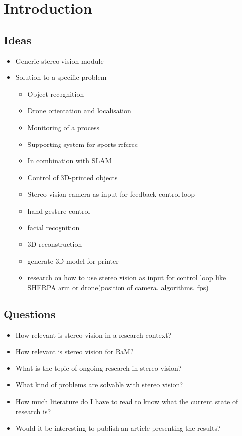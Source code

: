 \chapter{Introduction}
\label{ch:one}

\section{Ideas}

\begin{itemize}
	\item Generic stereo vision module
	\item Solution to a specific problem
	\begin{itemize}
	\item Object recognition
	\item Drone orientation and localisation
	\item Monitoring of a process
	\item Supporting system for sports referee
	\item In combination with SLAM
	\item Control of 3D-printed objects
	\item Stereo vision camera as input for feedback control loop
	\item hand gesture control
	\item facial recognition
	\item 3D reconstruction
	\item generate 3D model for printer
	\item research on how to use stereo vision as input for control loop like SHERPA arm or drone(position of camera, algorithms, fps)
	\end{itemize}
\end{itemize}

\section{Questions}
\begin{itemize}
	\item How relevant is stereo vision in a research context?
	\item How relevant is stereo vision for RaM?
	\item What is the topic of ongoing research in stereo vision?
	\item What kind of problems are solvable with stereo vision?
	\item How much literature do I have to read to know what the current state of research is?
	\item Would it be interesting to publish an article presenting the results?
	\end{itemize}

